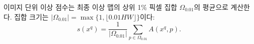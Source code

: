 \begin{samepage}
이미지 단위 이상 점수는 최종 이상 맵의 상위 1\% 픽셀 집합 $\Omega_{0.01}$의 평균으로 계산한다. 집합 크기는 $|\Omega_{0.01}|=\max\{1,\lfloor0.01HW\rfloor\}$이다:
\begin{equation}
  s(x^q) = \frac{1}{|\Omega_{0.01}|} \sum_{p \in \Omega_{0.01}} A(x^q, p).
  \label{eq:image-score}
\end{equation}
\end{samepage}
